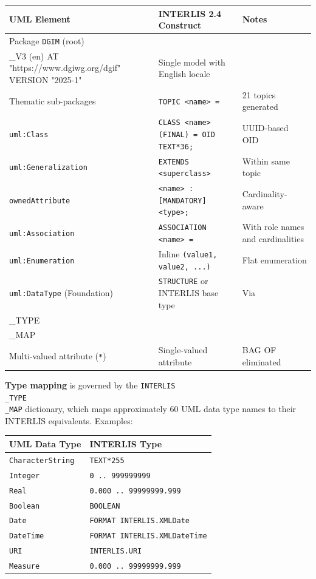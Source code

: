 \documentclass[conference]{IEEEtran}
\begin{document}
\begin{center}
\begin{longtable}{p{}p{}p{}}
UML Element & INTERLIS 2.4 Construct & Notes \\
\midrule
Package \texttt{DGIM} (root) & \texttt{MODEL DGIF\\_V3 (en) AT "https://www.dgiwg.org/dgif" VERSION "2025-1"} & Single model with English locale \\
Thematic sub-packages & \texttt{TOPIC <name> =} & 21 topics generated \\
\texttt{uml:Class} & \texttt{CLASS <name> (FINAL) = OID TEXT*36;} & UUID-based OID \\
\texttt{uml:Generalization} & \texttt{EXTENDS <superclass>} & Within same topic \\
\texttt{ownedAttribute} & \texttt{<name> : [MANDATORY] <type>;} & Cardinality-aware \\
\texttt{uml:Association} & \texttt{ASSOCIATION <name> =} & With role names and cardinalities \\
\texttt{uml:Enumeration} & Inline \texttt{(value1, value2, ...)} & Flat enumeration \\
\texttt{uml:DataType} (Foundation) & \texttt{STRUCTURE} or INTERLIS base type & Via \texttt{INTERLIS\\_TYPE\\_MAP} (≈60 entries) \\
Multi-valued attribute (\texttt{*}) & Single-valued attribute & BAG OF eliminated \\
\end{longtable}
\end{center}


\textbf{Type mapping} is governed by the \texttt{INTERLIS\\_TYPE\\_MAP} dictionary, which maps approximately 60 UML data type names to their INTERLIS equivalents. Examples:

\begin{center}
\begin{longtable}{p{}p{}}
UML Data Type & INTERLIS Type \\
\midrule
\texttt{CharacterString} & \texttt{TEXT*255} \\
\texttt{Integer} & \texttt{0 .. 999999999} \\
\texttt{Real} & \texttt{0.000 .. 99999999.999} \\
\texttt{Boolean} & \texttt{BOOLEAN} \\
\texttt{Date} & \texttt{FORMAT INTERLIS.XMLDate} \\
\texttt{DateTime} & \texttt{FORMAT INTERLIS.XMLDateTime} \\
\texttt{URI} & \texttt{INTERLIS.URI} \\
\texttt{Measure} & \texttt{0.000 .. 99999999.999} \\
\end{longtable}
\end{center}
\end{document}
